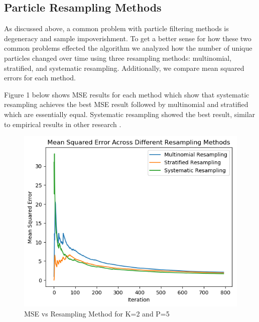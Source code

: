 \documentclass{article}
\begin{document}
\subsection{Particle Resampling Methods}

As discussed above, a common problem with particle filtering methods is degeneracy and sample impoverishment. To get a better sense for how these two common problems effected the algorithm we analyzed how the number of unique particles changed over time using three resampling methods: multinomial, stratified, and systematic resampling. Additionally, we compare mean squared errors for each method. 

Figure 1 below shows MSE results for each method which show that systematic resampling achieves the best MSE result followed by multinomial and stratified which are essentially equal. Systematic resampling showed the best result, similar to empirical results in other research \cite{doucet2009tutorial}.

\begin{figure}[ht]
\begin{center}
\centerline{\includegraphics[width=\columnwidth]{mse_resample}}
\caption{MSE vs Resampling Method for K=2 and P=5}
\label{MSEResampling}
\end{center}
\vskip -0.4in
\end{figure}
\end{document}
